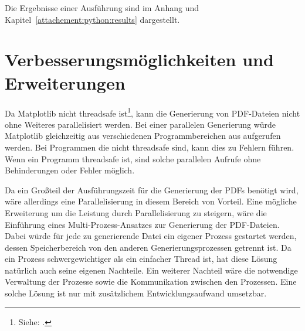 Die Ergebnisse einer Ausführung sind im Anhang und Kapitel~\ref{attachement:python:results} dargestellt.

\section{Verbesserungsmöglichkeiten und Erweiterungen}
Da Matplotlib nicht threadsafe ist\footnote{Siehe: \cite{Stackoverflow2016}.}, kann die Generierung von PDF-Dateien nicht ohne Weiteres parallelisiert werden.
Bei einer parallelen Generierung würde Matplotlib gleichzeitig aus verschiedenen Programmbereichen aus aufgerufen werden.
Bei Programmen die nicht threadsafe sind, kann dies zu Fehlern führen.
Wenn ein Programm threadsafe ist, sind solche parallelen Aufrufe ohne Behinderungen oder Fehler möglich.

Da ein Großteil der Ausführungszeit für die Generierung der PDFs benötigt wird, wäre allerdings eine Parallelisierung in diesem Bereich von Vorteil.
Eine mögliche Erweiterung um die Leistung durch Parallelisierung zu steigern, wäre die Einführung eines Multi-Prozess-Ansatzes zur Generierung der PDF-Dateien.
Dabei würde für jede zu generierende Datei ein eigener Prozess gestartet werden, dessen Speicherbereich von den anderen Generierungsprozessen getrennt ist.
Da ein Prozess schwergewichtiger als ein einfacher Thread ist, hat diese Lösung natürlich auch seine eigenen Nachteile.
Ein weiterer Nachteil wäre die notwendige Verwaltung der Prozesse sowie die Kommunikation zwischen den Prozessen.
Eine solche Lösung ist nur mit zusätzlichem Entwicklungsaufwand umsetzbar.